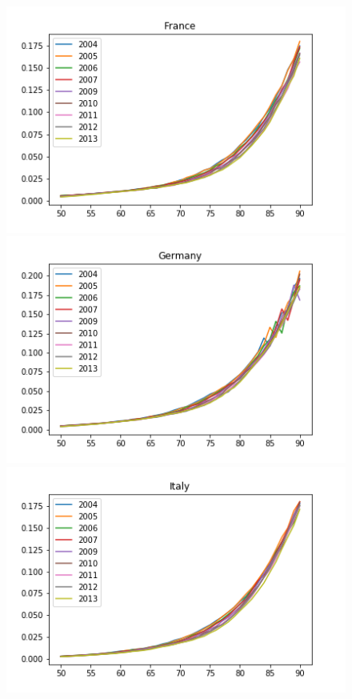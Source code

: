 \begin{figure}[H]
\endminipage \hfill
{}
  \includegraphics[width=\linewidth]{images/mortality_male_4.png}
\endminipage\hfill
{}
  \includegraphics[width=\linewidth]{images/mortality_male_5.png}
\endminipage\hfill
{}%
  \includegraphics[width=\linewidth]{images/mortality_male_6.png}

\end{figure}
